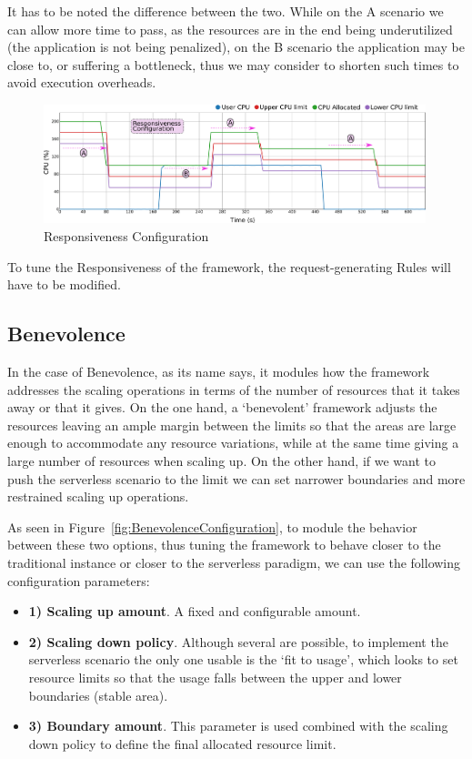 \documentclass[12pt]{article}
\begin{document}
It has to be noted the difference between the two. While on the A scenario we can allow more time to pass, as the resources are in the end being underutilized (the application is not being penalized), on the B scenario the application may be close to, or suffering a bottleneck, thus we may consider to shorten such times to avoid execution overheads.

\begin{figure}[!tb]
	\centering
	\includegraphics[width=0.99\textwidth]{../img/configuration/configuration_responsiveness.png}
	\caption{Responsiveness Configuration}
	\label{fig:ResponsivenessConfiguration}
\end{figure}

To tune the Responsiveness of the framework, the request-generating Rules will have to be modified.

\subsection{Benevolence}

In the case of Benevolence, as its name says, it modules how the framework addresses the scaling operations in terms of the number of resources that it takes away or that it gives. On the one hand, a `benevolent' framework adjusts the resources leaving an ample margin between the limits so that the areas are large enough to accommodate any resource variations, while at the same time giving a large number of resources when scaling up. On the other hand, if we want to push the serverless scenario to the limit we can set narrower boundaries and more restrained scaling up operations.

As seen in Figure~\ref{fig:BenevolenceConfiguration}, to module the behavior between these two options, thus tuning the framework to behave closer to the traditional instance or closer to the serverless paradigm, we can use the following configuration parameters:
\begin{itemize}
	\item \textbf{1) Scaling up amount}. A fixed and configurable amount.
	\item \textbf{2) Scaling down policy}. Although several are possible, to implement the serverless scenario the only one usable is the `fit to usage', which looks to set resource limits so that the usage falls between the upper and lower boundaries (stable area).
	\item \textbf{3) Boundary amount}. This parameter is used combined with the scaling down policy to define the final allocated resource limit.
\end{itemize}
\end{document}
